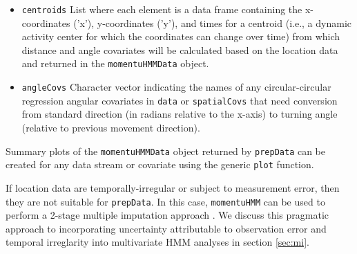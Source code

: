 \documentclass[12pt]{article}\usepackage[]{graphicx}\usepackage[]{color}
\begin{document}
\begin{itemize}
  \item{\verb|centroids|} List where each element is a data frame containing the x-coordinates ('x'), y-coordinates ('y'), and times for a centroid (i.e., a dynamic activity center for which the coordinates can change over time) from which distance and angle covariates will be calculated based on the location data and returned in the \verb|momentuHMMData| object.
  \item{\verb|angleCovs|} Character vector indicating the names of any circular-circular regression angular covariates in \verb|data| or \verb|spatialCovs| that need conversion from standard direction (in radians relative to the x-axis) to turning angle (relative to previous movement direction).
\end{itemize}
Summary plots of the \verb|momentuHMMData| object returned by \verb|prepData| can be created for any data stream or covariate using the generic \verb|plot| function.

If location data are temporally-irregular or subject to measurement error, then they are not suitable for \verb|prepData|. In this case, \verb|momentuHMM| can be used to perform a 2-stage multiple imputation approach \citep{McClintock2017}. We discuss this pragmatic approach to incorporating uncertainty attributable to observation error and temporal irreglarity into multivariate HMM analyses in section \ref{sec:mi}.
\end{document}
